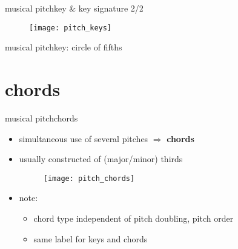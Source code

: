         \begin{frame}{musical pitch}{key \& key signature 2/2}
            \vspace{-3mm}
                \begin{figure}[t]
                    \centering
                    \texttt{[image: pitch\_keys]}
                \end{figure}
        \end{frame}
        
        \begin{frame}{musical pitch}{key: circle of fifths}
            \vspace{-9mm}
            \begin{figure}
            \scalebox{.9}
            {
                    \centering
                    
                
            }	
            \end{figure}
        \end{frame}
        
    \section{chords}
        \begin{frame}{musical pitch}{chords}
            \begin{itemize}
                \item	simultaneous use of several pitches $\Rightarrow$ \textbf{chords}
                \item	usually constructed of (major/minor) thirds
                \begin{figure}[t]
                    \centering
                    \texttt{[image: pitch\_chords]}
                \end{figure}
                
                \smallskip
                \item<2->	note:
                        \begin{itemize}
                            \item	chord type independent of pitch doubling, pitch order
                            \item	same label for keys and chords
                        \end{itemize}
            \end{itemize}
        \end{frame}
        
